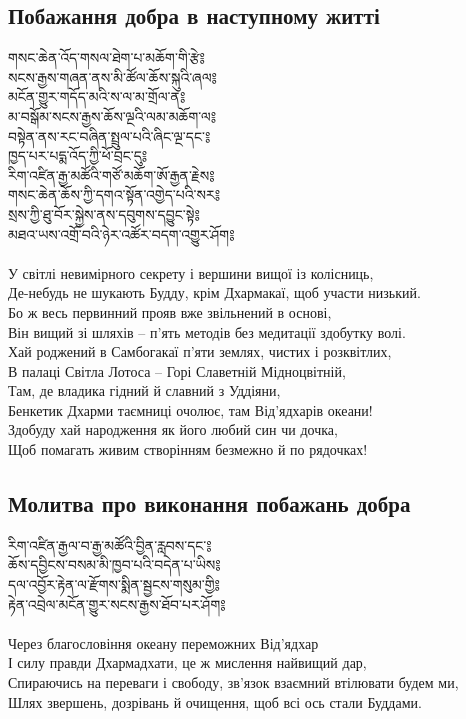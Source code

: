 \subsection{Побажання добра в наступному житті}
\vspace{0.5cm}
\ti
གསང་ཆེན་འོད་གསལ་ཐེག་པ་མཆོག་གི་རྩེ༔\\
སངས་རྒྱས་གཞན་ནས་མི་ཚོལ་ཆོས་སྐུའི་ཞལ༔\\
མངོན་གྱུར་གདོད་མའི་ས་ལ་མ་གྲོལ་ན༔\\
མ་བསྒོམ་སངས་རྒྱས་ཆོས་ལྔའི་ལམ་མཆོག་ལ༔\\
བསྟེན་ནས་རང་བཞིན་སྤྲུལ་པའི་ཞིང་ལྔ་དང་༔\\
ཁྱད་པར་པདྨ་འོད་ཀྱི་ཕོ་བྲང་དུ༔\\
རིག་འཛིན་རྒྱ་མཚོའི་གཙོ་མཆོག་ཨོ་རྒྱན་རྗེས༔\\
གསང་ཆེན་ཆོས་ཀྱི་དགའ་སྟོན་འགྱེད་པའི་སར༔\\
སྲས་ཀྱི་ཐུ་བོར་སྐྱེས་ནས་དབུགས་དབྱུང་སྟེ༔\\
མཐའ་ཡས་འགྲོ་བའི་ཉེར་འཚོར་བདག་འགྱུར་ཤོག༔\\
\\
\ru
У світлі невимірного секрету і вершини вищої із колісниць,\\
Де-небудь не шукають Будду, крім Дхармакаї, щоб участи низький.\\
Бо ж весь первинний прояв вже звільнений в основі,\\
Він вищий зі шляхів -- п'ять методів без медитації здобутку волі.\\
Хай роджений в Самбогакаї п'яти землях, чистих і розквітлих,\\
В палаці Світла Лотоса -- Горі Славетній Мідноцвітній,\\
Там, де владика гідний й славний з Уддіяни,\\
Бенкетик Дхарми таємниці очолює, там Від'ядхарів океани!\\
Здобуду хай народження як його любий син чи дочка,\\
Щоб помагать живим створінням безмежно й по рядочках!\\

\newpage
\subsection{Молитва про виконання побажань добра}
\vspace{0.5cm}
\ti
རིག་འཛིན་རྒྱལ་བ་རྒྱ་མཚོའི་བྱིན་རླབས་དང་༔\\
ཆོས་དབྱིངས་བསམ་མི་ཁྱབ་པའི་བདེན་པ་ཡིས༔\\
དལ་འབྱོར་རྟེན་ལ་རྫོགས་སྨིན་སྦྱངས་གསུམ་གྱི༔\\
རྟེན་འབྲེལ་མངོན་གྱུར་སངས་རྒྱས་ཐོབ་པར་ཤོག༔\\
\\
\ru
Через благословіння океану переможних Від'ядхар\\
І силу правди Дхармадхати, це ж мислення найвищий дар,\\
Спираючись на переваги і свободу, зв'язок взаємний втілювати будем ми,\\
Шлях звершень, дозрівань й очищення, щоб всі ось стали Буддами.\\
